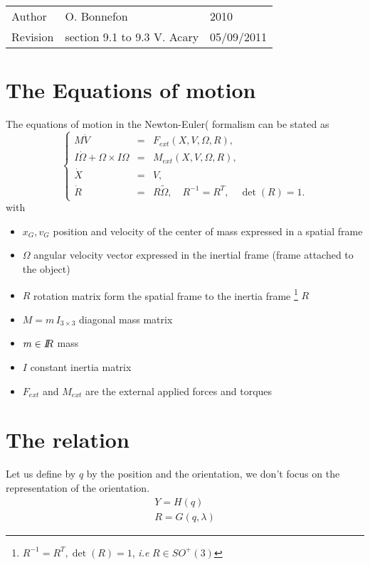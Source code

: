 
\begin{tabular}{lll}
  \centering
  Author &  O. Bonnefon &2010\\
  Revision& section 9.1 to 9.3 V. Acary&  05/09/2011
\end{tabular}
\section{The Equations of motion}

The equations of motion in the Newton-Euler(\cite{Wittenburg1977,Haug89} formalism can be stated as
\begin{equation}
  \label{eq:NewtonEuler}
  \left\{\begin{array}{rcl}
    M \dot V &=& F_{ext}(X, V, \Omega, R), \\
    I \dot \Omega + \Omega \times I\Omega &=&  M_{ext}(X,V, \Omega, R), \\
    \dot X &=& V, \\
    \dot R &=& R \tilde \Omega,\quad R^{-1}=R^T,\quad  \det(R)=1 .
\end{array}\right.
\end{equation}
with
\begin{itemize}
\item $x_G,v_G$ position and velocity of the center of mass expressed in a spatial frame
\item $\Omega$ angular velocity vector expressed in the inertial frame (frame attached to the object)
\item $R$ rotation matrix form the spatial frame to the inertia frame \footnote{$R^{-1}=R^T, \det(R)=1$, \textit{i.e} $ R\in SO^+(3)$} $R$ 
\item $M=m\,I_{3\times 3}$ diagonal mass matrix
\item $m \in \mbox{\rm $I\!\!R$}$ mass
\item $I$ constant inertia matrix
\item $F_{ext}$ and $ M_{ext}$ are the external applied forces and torques
\end{itemize}


\section{The relation}

Let us define by $q$ by  the position and the orientation, we don't focus on the  representation of the orientation.
\begin{equation}
\label{Relation}
\begin{array}{l}
Y=H(q)  \\
R=G(q,\lambda)
\end{array}
\end{equation}



